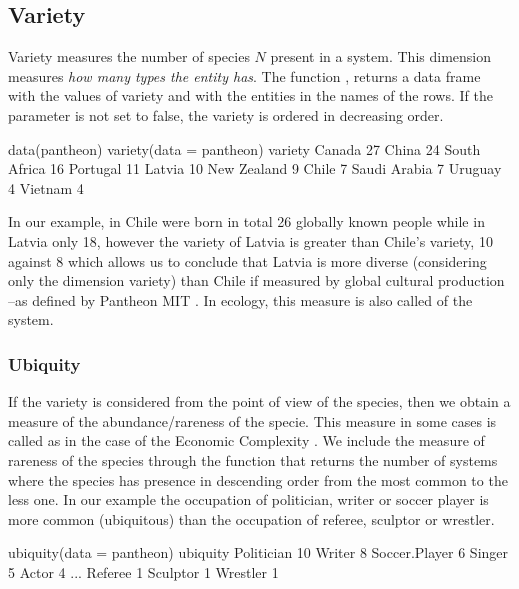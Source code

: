 \subsection{Variety}
Variety measures the number of species $N$ present in a system. This dimension measures \emph{how many types the entity has}. The function , returns a data frame with the values of variety and with the entities in the names of the rows. If the parameter  is not set to false, the variety is ordered in decreasing order.


\begin{example}
data(pantheon)
variety(data = pantheon)
             variety
Canada            27
China             24
South Africa      16
Portugal          11
Latvia            10
New Zealand        9
Chile              7
Saudi Arabia       7
Uruguay            4
Vietnam            4

\end{example}

In our example, in Chile were born in total 26 globally known people while in Latvia only 18, however the variety of Latvia is greater than Chile's variety, 10 against 8 which allows us to conclude that Latvia is more diverse (considering only the dimension variety) than Chile if measured by global cultural production --as defined by Pantheon MIT \cite{macroconnections_mit_medialab_pantheon_2014}. In ecology, this measure is also called  of the system.

\subsubsection{Ubiquity}
If the variety is considered from the point of view of the species, then we obtain a measure of the abundance/rareness of the specie. This measure in some cases is called  as in the case of the Economic Complexity \cite[p. 21]{hausmann_atlas_2011}. 
We include the measure of rareness of the species through the function  that returns the number of systems where the species has presence in descending order from the most common to the less one.
In our example the occupation of politician, writer or soccer player is more common (ubiquitous) than the occupation of referee, sculptor or wrestler. 

\begin{example}
   ubiquity(data = pantheon)
                    ubiquity
Politician                10
Writer                     8
Soccer.Player              6
Singer                     5
Actor                      4
...
Referee                    1
Sculptor                   1
Wrestler                   1
\end{example}

